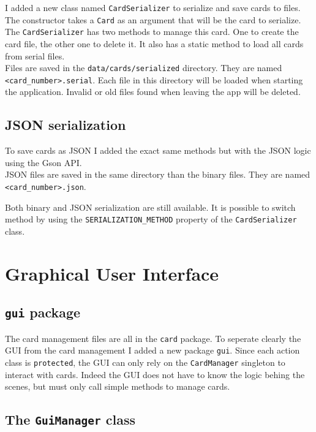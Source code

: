 \documentclass{article}
\begin{document}
I added a new class named \texttt{CardSerializer} to serialize and save
cards to files. The constructor takes a \texttt{Card} as an argument
that will be the card to serialize. The \texttt{CardSerializer} has two
methods to manage this card. One to create the card file, the other one
to delete it. It also has a static method to load all cards from serial
files.\\

\noindent
Files are saved in the \texttt{data/cards/serialized} directory. They are named
\texttt{<card\_number>.serial}. Each file in this directory will be loaded when
starting the application. Invalid or old files found when leaving the app will
be deleted.

\subsection{JSON serialization}

To save cards as JSON I added the exact same methods but with the JSON
logic using the Gson API.\\

\noindent
JSON files are saved in the same directory than the binary files. They are named
\texttt{<card\_number>.json}.

\noindent
Both binary and JSON serialization are still available. It is possible
to switch method by using the \texttt{SERIALIZATION\_METHOD} property of
the \texttt{CardSerializer} class.

\section{Graphical User Interface}

\subsection{\texttt{gui} package}

The card management files are all in the \texttt{card} package. To
seperate clearly the GUI from the card management I added a new package
\texttt{gui}. Since each action class is \texttt{protected}, the GUI can only
rely on the \texttt{CardManager} singleton to interact with cards.
Indeed the GUI does not have to know the logic behing the scenes, but
must only call simple methods to manage cards.

\subsection{The \texttt{GuiManager} class}
\end{document}
